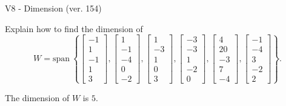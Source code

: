 \begin{exercise}
  \begin{exerciseTitle}V8 - Dimension (ver. 154)\end{exerciseTitle}
  \begin{exerciseStatement}
    Explain how to find the dimension of 
\[W=\mathrm{span}\ \left\{\left[\begin{array}{r}
-1 \\
1 \\
-1 \\
1 \\
3
\end{array}\right] , \left[\begin{array}{r}
1 \\
-1 \\
-4 \\
0 \\
-2
\end{array}\right] , \left[\begin{array}{r}
1 \\
-3 \\
1 \\
0 \\
3
\end{array}\right] , \left[\begin{array}{r}
-3 \\
-3 \\
1 \\
-2 \\
0
\end{array}\right] , \left[\begin{array}{r}
4 \\
20 \\
-3 \\
7 \\
-4
\end{array}\right] , \left[\begin{array}{r}
-1 \\
-4 \\
3 \\
-2 \\
2
\end{array}\right]\right\}.\]



  \end{exerciseStatement}
  \begin{exerciseAnswer}
   The dimension of \(W\) is  \(5\).
  


  \end{exerciseAnswer}
\end{exercise}